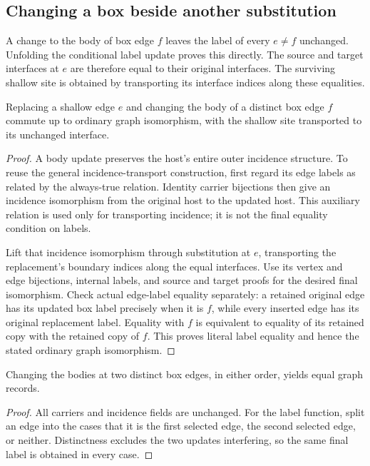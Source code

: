\subsection{Changing a box beside another substitution}
A change to the body of box edge $f$ leaves the label of every $e\ne f$
unchanged. Unfolding the conditional label update proves this directly.
The source and target interfaces at $e$ are therefore equal to their
original interfaces. The surviving shallow site is obtained by transporting
its interface indices along these equalities.

\begin{lemma}
Replacing a shallow edge $e$ and changing the body of a distinct box edge
$f$ commute up to ordinary graph isomorphism, with the shallow site
transported to its unchanged interface.
\end{lemma}
\begin{proof}
A body update preserves the host's entire outer incidence structure.
To reuse the general incidence-transport construction, first regard its
edge labels as related by the always-true relation. Identity carrier
bijections then give an incidence isomorphism from the original host to
the updated host. This auxiliary relation is used only for transporting
incidence; it is not the final equality condition on labels.

Lift that incidence isomorphism through substitution at $e$, transporting
the replacement's boundary indices along the equal interfaces.
Use its vertex and edge bijections, internal labels, and source and target
proofs for the desired final isomorphism. Check actual edge-label equality
separately: a retained original edge has its updated box label precisely
when it is $f$, while every inserted edge has its original replacement
label. Equality with $f$ is equivalent to equality of its retained copy
with the retained copy of $f$. This proves literal label equality and
hence the stated ordinary graph isomorphism.
\end{proof}

\begin{lemma}
Changing the bodies at two distinct box edges, in either order, yields
equal graph records.
\end{lemma}
\begin{proof}
All carriers and incidence fields are unchanged. For the label function,
split an edge into the cases that it is the first selected edge, the
second selected edge, or neither. Distinctness excludes the two updates
interfering, so the same final label is obtained in every case.
\end{proof}

